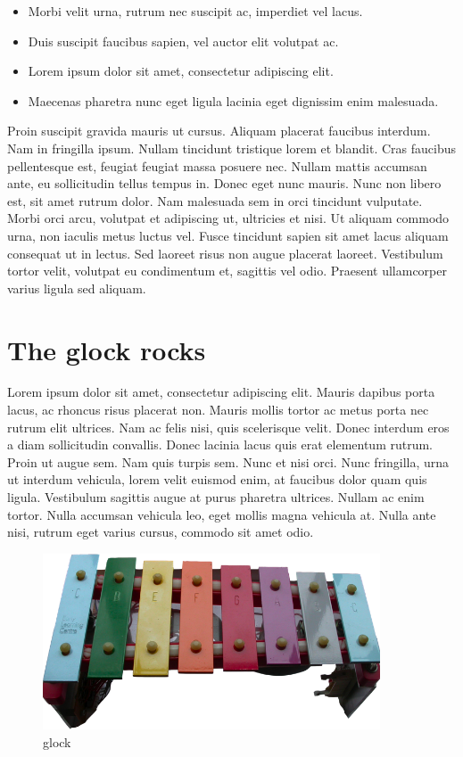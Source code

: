 \documentclass[11pt,oneside,openany]{book}
\begin{document}
\begin{itemize}
\item Morbi velit urna, rutrum nec suscipit ac, imperdiet vel lacus.
\item Duis suscipit faucibus sapien, vel auctor elit volutpat ac.
\item Lorem ipsum dolor sit amet, consectetur adipiscing elit.
\item Maecenas pharetra nunc eget ligula lacinia eget dignissim enim malesuada.
\end{itemize}

Proin suscipit gravida mauris ut cursus. Aliquam placerat faucibus interdum. Nam in fringilla ipsum. Nullam tincidunt tristique lorem et blandit. Cras faucibus pellentesque est, feugiat feugiat massa posuere nec. Nullam mattis accumsan ante, eu sollicitudin tellus tempus in. Donec eget nunc mauris. Nunc non libero est, sit amet rutrum dolor. Nam malesuada sem in orci tincidunt vulputate. Morbi orci arcu, volutpat et adipiscing ut, ultricies et nisi. Ut aliquam commodo urna, non iaculis metus luctus vel. Fusce tincidunt sapien sit amet lacus aliquam consequat ut in lectus. Sed laoreet risus non augue placerat laoreet. Vestibulum tortor velit, volutpat eu condimentum et, sagittis vel odio. Praesent ullamcorper varius ligula sed aliquam.	

\chapter{The glock rocks}\hypertarget{the-glock-rocks}{}\label{the-glock-rocks}

Lorem ipsum dolor sit amet, consectetur adipiscing elit. Mauris dapibus porta lacus, ac rhoncus risus placerat non. Mauris mollis tortor ac metus porta nec rutrum elit ultrices. Nam ac felis nisi, quis scelerisque velit. Donec interdum eros a diam sollicitudin convallis. Donec lacinia lacus quis erat elementum rutrum. Proin ut augue sem. Nam quis turpis sem. Nunc et nisi orci. Nunc fringilla, urna ut interdum vehicula, lorem velit euismod enim, at faucibus dolor quam quis ligula. Vestibulum sagittis augue at purus pharetra ultrices. Nullam ac enim tortor. Nulla accumsan vehicula leo, eget mollis magna vehicula at. Nulla ante nisi, rutrum eget varius cursus, commodo sit amet odio.

\begin{figure}
\begin{center}
\includegraphics[width=100mm]{output/pdf/_media/glock1.png}
\end{center}
\caption{glock}

\end{figure}
\end{document}
